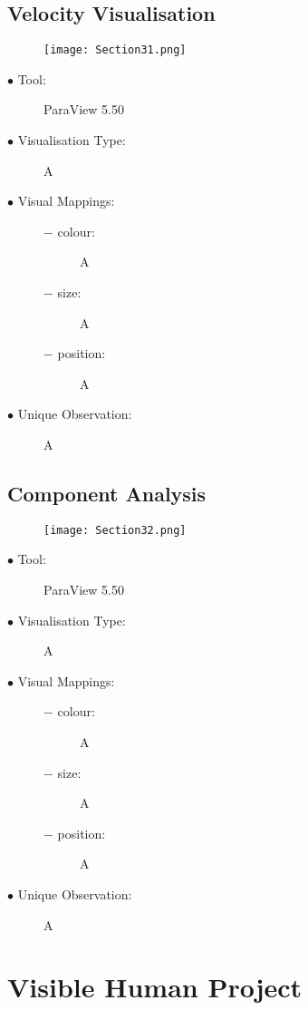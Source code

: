 \documentclass{article}
\begin{document}
\subsection{Velocity Visualisation}
\begin{figure}[h]
	\centering
	\texttt{[image: Section31.png]}
\end{figure}
\begin{description}
	\item[$\bullet$ Tool:] ParaView 5.50
	\item[$\bullet$ Visualisation Type:] A
	\item[$\bullet$ Visual Mappings:] \hfill
		\begin{description}
			\item[$-$ colour:] A
			\item[$-$ size:] A
			\item[$-$ position:] A
		\end{description}
	\item[$\bullet$ Unique Observation:] A
\end{description}
\newpage

\subsection{Component Analysis}
\begin{figure}[h]
	\centering
	\texttt{[image: Section32.png]}
\end{figure}
\begin{description}
	\item[$\bullet$ Tool:] ParaView 5.50
	\item[$\bullet$ Visualisation Type:] A
	\item[$\bullet$ Visual Mappings:] \hfill
		\begin{description}
			\item[$-$ colour:] A
			\item[$-$ size:] A
			\item[$-$ position:] A
		\end{description}
	\item[$\bullet$ Unique Observation:] A
\end{description}
\newpage

\section{Visible Human Project}
\end{document}
